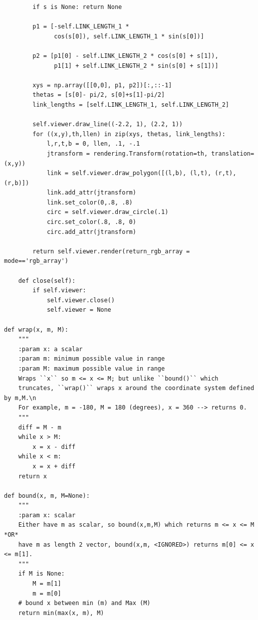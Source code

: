 \documentclass[cic,tc]{iiufrgs}
\newenvironment{longlisting}{\captionsetup{type=listing}}{}
\begin{document}
\begin{longlisting}
\begin{verbatim}
        if s is None: return None

        p1 = [-self.LINK_LENGTH_1 *
              cos(s[0]), self.LINK_LENGTH_1 * sin(s[0])]

        p2 = [p1[0] - self.LINK_LENGTH_2 * cos(s[0] + s[1]),
              p1[1] + self.LINK_LENGTH_2 * sin(s[0] + s[1])]

        xys = np.array([[0,0], p1, p2])[:,::-1]
        thetas = [s[0]- pi/2, s[0]+s[1]-pi/2]
        link_lengths = [self.LINK_LENGTH_1, self.LINK_LENGTH_2]

        self.viewer.draw_line((-2.2, 1), (2.2, 1))
        for ((x,y),th,llen) in zip(xys, thetas, link_lengths):
            l,r,t,b = 0, llen, .1, -.1
            jtransform = rendering.Transform(rotation=th, translation=(x,y))
            link = self.viewer.draw_polygon([(l,b), (l,t), (r,t), (r,b)])
            link.add_attr(jtransform)
            link.set_color(0,.8, .8)
            circ = self.viewer.draw_circle(.1)
            circ.set_color(.8, .8, 0)
            circ.add_attr(jtransform)

        return self.viewer.render(return_rgb_array = mode=='rgb_array')

    def close(self):
        if self.viewer:
            self.viewer.close()
            self.viewer = None

def wrap(x, m, M):
    """
    :param x: a scalar
    :param m: minimum possible value in range
    :param M: maximum possible value in range
    Wraps ``x`` so m <= x <= M; but unlike ``bound()`` which
    truncates, ``wrap()`` wraps x around the coordinate system defined by m,M.\n
    For example, m = -180, M = 180 (degrees), x = 360 --> returns 0.
    """
    diff = M - m
    while x > M:
        x = x - diff
    while x < m:
        x = x + diff
    return x

def bound(x, m, M=None):
    """
    :param x: scalar
    Either have m as scalar, so bound(x,m,M) which returns m <= x <= M *OR*
    have m as length 2 vector, bound(x,m, <IGNORED>) returns m[0] <= x <= m[1].
    """
    if M is None:
        M = m[1]
        m = m[0]
    # bound x between min (m) and Max (M)
    return min(max(x, m), M)



\end{verbatim}
\end{longlisting}
\end{document}
